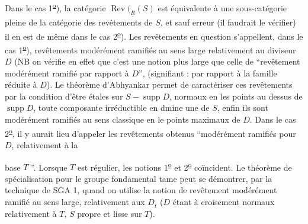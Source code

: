Dans le cas 1\textsuperscript{\uline{o}}), la catégorie $\operatorname{Rev}(_{\underline{R}}(S)$ est équivalente à une sous-catégorie pleine de la catégorie des revêtements de $S$, et sauf erreur (il faudrait le vérifier) il en est de même dans le cas 2\textsuperscript{\uline{o}}). Les revêtements en question s'appellent, dans le cas 1\textsuperscript{\uline{o}}), revêtements modérément ramifiés au sens large relativement au diviseur $D$ (NB on vérifie en effet que c'est une notion plus large que celle de ``revêtement modérément ramifié par rapport à $D$'', (signifiant : par rapport à la famille réduite à $D$). Le théorème d'Abhyankar permet de caractériser ces revêtements par la condition d'être étales sur  $S-\operatorname{supp}D$, normaux en les points au dessus de $\operatorname{supp}D$, toute composante irréductible en dmine une de $S$, enfin ils sont modérément ramifiés au sens classique en le points maximaux de $D$. Dans le cas 2\textsuperscript{\uline{o}}, il y aurait lieu d'appeler les revêtements obtenus ``modérément ramifiés pour $D$, relativement à la

base $T$ ''. Lorsque $T$ est régulier, les notions 1\textsuperscript{\uline{o}} et 2\textsuperscript{\uline{o}} coïncident. Le théorème de spécialisation pour le groupe fondamental tame peut se démontrer, par la technique de SGA 1, quand on utilise la notion de revêtement modérément ramifié au sens large, relativement aux $D_{\bar{t}}$  ($D$ étant à croisement normaux relativement à $T$, $S$ propre et lisse sur $T$).


